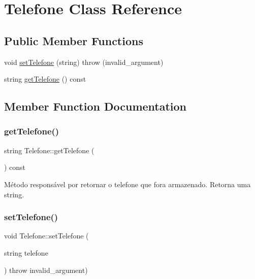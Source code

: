\hypertarget{classTelefone}{}\section{Telefone Class Reference}
\label{classTelefone}
\subsection*{Public Member Functions}
\begin{DoxyCompactItemize}
\item 
void \hyperlink{classTelefone_a79516b37434ff927bd2a9bd66080a36d}{set\+Telefone} (string)  throw (invalid\+\_\+argument)
\item 
string \hyperlink{classTelefone_a64d1e99657fde65bb698ddcd56e7eb04}{get\+Telefone} () const
\end{DoxyCompactItemize}


\subsection{Member Function Documentation}
\mbox{\label{classTelefone_a64d1e99657fde65bb698ddcd56e7eb04}} 
\subsubsection{\texorpdfstring{get\+Telefone()}{getTelefone()}}
{\footnotesize\ttfamily string Telefone\+::get\+Telefone (\begin{DoxyParamCaption}{ }\end{DoxyParamCaption}) const\hspace{0.3cm}{\ttfamily [inline]}}

Método responsável por retornar o telefone que fora armazenado. Retorna uma string. \mbox{\label{classTelefone_a79516b37434ff927bd2a9bd66080a36d}} 
\subsubsection{\texorpdfstring{set\+Telefone()}{setTelefone()}}
{\footnotesize\ttfamily void Telefone\+::set\+Telefone (\begin{DoxyParamCaption}\item[{string}]{telefone }\end{DoxyParamCaption}) throw  invalid\+\_\+argument) }

